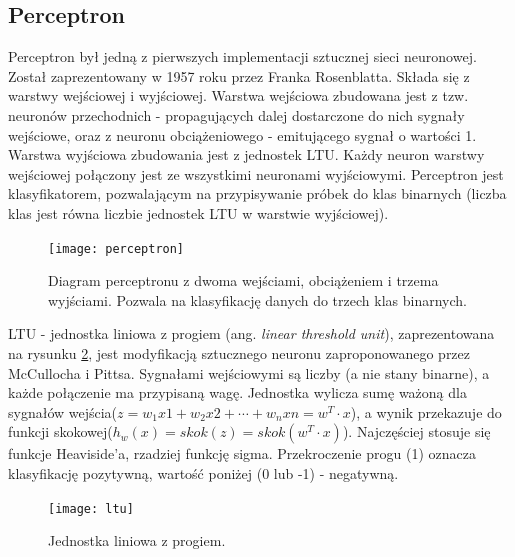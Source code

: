 \documentclass[a4paper,12pt]{article}
\numberwithin{figure}{section}
\begin{document}
    \subsection{Perceptron}

    Perceptron był jedną z pierwszych implementacji sztucznej sieci neuronowej. Został zaprezentowany w 1957 roku przez Franka Rosenblatta. Składa się z warstwy wejściowej i wyjściowej. Warstwa wejściowa zbudowana jest z tzw. neuronów przechodnich - propagujących dalej dostarczone do nich sygnały wejściowe, oraz z neuronu obciążeniowego - emitującego sygnał o wartości 1. Warstwa wyjściowa zbudowania jest z jednostek LTU. Każdy neuron warstwy wejściowej połączony jest ze wszystkimi neuronami wyjściowymi. Perceptron jest klasyfikatorem, pozwalającym na przypisywanie próbek do klas binarnych (liczba klas jest równa liczbie jednostek LTU w warstwie wyjściowej)\cite{UczenieMaszynowe2018}.

    \bigskip

    \begin{figure}[H]
        \centering
        \texttt{[image: perceptron]}
        \caption{Diagram perceptronu z dwoma wejściami, obciążeniem i trzema wyjściami. Pozwala na klasyfikację danych do trzech klas binarnych\cite{UczenieMaszynowe2018}.}
        \label{fig:perceptron}
    \end{figure}

    \bigskip

    LTU - jednostka liniowa z progiem (ang. \textit{linear threshold unit}), zaprezentowana na rysunku \ref{fig:ltu}, jest modyfikacją sztucznego neuronu zaproponowanego przez McCullocha i Pittsa. Sygnałami wejściowymi są liczby (a nie stany binarne), a każde połączenie ma przypisaną wagę. Jednostka wylicza sumę ważoną dla sygnałów wejścia($z=w_{1}x{1} + w_{2}x{2} + \cdots + w_{n}x{n} = w^{T} \cdot x$), a wynik przekazuje do funkcji skokowej($h_{w}(x) = skok(z) = skok(w^{T} \cdot x)$). Najczęściej stosuje się funkcje Heaviside'a, rzadziej funkcję sigma. Przekroczenie progu (1) oznacza klasyfikację pozytywną, wartość poniżej (0 lub -1) - negatywną\cite{UczenieMaszynowe2018}.

    \bigskip

    \begin{figure}[H]
        \centering
        \texttt{[image: ltu]}
        \caption{Jednostka liniowa z progiem\cite{UczenieMaszynowe2018}.}
        \label{fig:ltu}
    \end{figure}

    \bigskip
\end{document}
